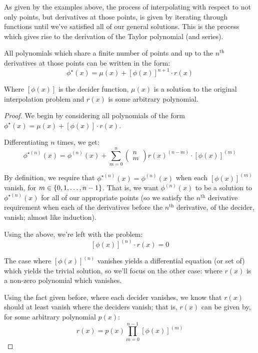 As given by the examples above, the process of interpolating with respect to not only points, but derivatives at those points, is given by iterating through functions until we've satisfied all of our general solutions. This is the process which gives rise to the derivation of the Taylor polynomial (and series).

\begin{theorem}
    \label{theorem:shared_derivatives_theorem}
    All polynomials which share a finite number of points and up to the $n^\text{th}$ derivatives at those points can be written in the form:
    $$
        \phi^\star(x) = \mu(x) + [\phi(x)]^{n+1}\cdot r(x)
    $$

    Where $[\phi(x)]$ is the decider function, $\mu(x)$ is a solution to the original interpolation problem and $r(x)$ is some arbitrary polynomial.

    \begin{proof}
        We begin by considering all polynomials of the form $\phi^\star(x)=\mu(x)+[\phi(x)]\cdot r(x)$.

        Differentiating $n$ times, we get:
        $$
            \phi^{\star(n)}(x) = \phi^{(n)}(x) + \sum_{m=0}^{n}{\begin{pmatrix} n \\ m \end{pmatrix}r(x)^{(n-m)}\cdot [\phi(x)]^{(m)}}
        $$

        By definition, we require that $\phi^{\star(n)}(x)=\phi^{(n)}(x)$ when each $[\phi(x)]^{(m)}$ vanish, for $m\in\{0,1,\dots,n-1\}$. That is, we want $\phi^{(n)}(x)$ to be a solution to $\phi^{\star(n)}(x)$ for all of our appropriate points (so we satisfy the $n^\text{th}$ derivative requirement when each of the derivatives before the $n^\text{th}$ derivative, of the decider, vanish; almost like induction).

        Using the above, we're left with the problem:
        $$
            [\phi(x)]^{(n)}\cdot r(x)=0
        $$

        The case where $[\phi(x)]^{(n)}$ vanishes yields a differential equation (or set of) which yields the trivial solution, so we'll focus on the other case: where $r(x)$ is a non-zero polynomial which vanishes.

        Using the fact given before, where each decider vanishes, we know that $r(x)$ should at least vanish where the deciders vanish; that is, $r(x)$ can be given by, for some arbitrary polynomial $p(x)$:
        $$
            r(x) = p(x)\prod_{m=0}^{n-1}{[\phi(x)]^{(m)}}
        $$


\end{proof}
\end{theorem}
